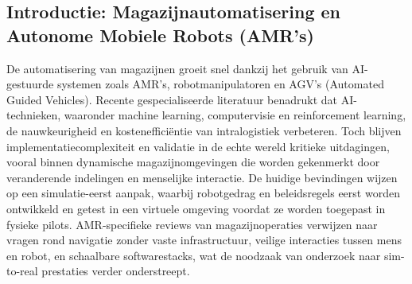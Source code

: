 
\subsection{Introductie: Magazijnautomatisering en Autonome Mobiele Robots (AMR's)}
De automatisering van magazijnen groeit snel dankzij het gebruik van AI-gestuurde systemen zoals AMR's, robotmanipulatoren en AGV's (Automated Guided Vehicles). 
Recente gespecialiseerde literatuur benadrukt dat AI-technieken, waaronder machine learning, computervisie en reinforcement learning, de nauwkeurigheid en kostenefficiëntie van intralogistiek verbeteren. 
Toch blijven implementatiecomplexiteit en validatie in de echte wereld kritieke uitdagingen, vooral binnen dynamische magazijnomgevingen die worden gekenmerkt door veranderende indelingen en menselijke interactie. 
De huidige bevindingen wijzen op een simulatie-eerst aanpak, waarbij robotgedrag en beleidsregels eerst worden ontwikkeld en getest in een virtuele omgeving voordat ze worden toegepast in fysieke pilots. 
AMR-specifieke reviews van magazijnoperaties verwijzen naar vragen rond navigatie zonder vaste infrastructuur, veilige interacties tussen mens en robot, en schaalbare softwarestacks, wat de noodzaak van onderzoek naar sim-to-real prestaties verder onderstreept. %
\autocite{Sodiya2024, Keith2024}

